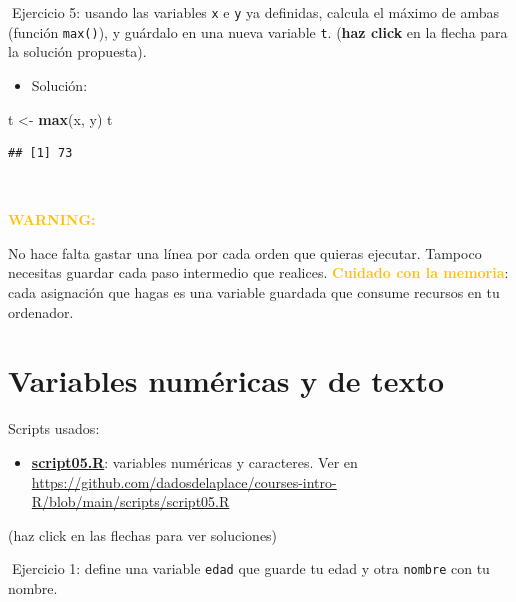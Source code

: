 \documentclass[11pt,]{book}
\newenvironment{Shaded}{\begin{snugshade}}{\end{snugshade}}
\newcommand{\KeywordTok}[1]{\textcolor[rgb]{0.27,0.27,0.27}{\textbf{#1}}}
\newcommand{\NormalTok}[1]{#1}
\newcommand{\StringTok}[1]{\textcolor[rgb]{0.5,0.5,0.5}{#1}}
\providecommand{\tightlist}{%
  \setlength{\itemsep}{0pt}\setlength{\parskip}{0pt}}
\begin{document}
📝Ejercicio 5: usando las variables \texttt{x} e \texttt{y} ya definidas, calcula el máximo de ambas (función \texttt{max()}), y guárdalo en una nueva variable \texttt{t}. (\textbf{haz click} en la flecha para la solución propuesta).

\begin{itemize}
\tightlist
\item
  Solución:
\end{itemize}

\begin{Shaded}
\begin{Highlighting}[]
\NormalTok{t <-}\StringTok{ }\KeywordTok{max}\NormalTok{(x, y)}
\NormalTok{t}
\end{Highlighting}
\end{Shaded}

\begin{verbatim}
## [1] 73
\end{verbatim}

~

\textbf{\textcolor{#ffc107}{WARNING:}}

No hace falta gastar una línea por cada orden que quieras ejecutar. Tampoco necesitas guardar cada paso intermedio que realices. \textbf{\textcolor{#ffc107}{Cuidado con la memoria}}: cada asignación que hagas es una variable guardada que consume recursos en tu ordenador.

\hypertarget{variables-numuxe9ricas-y-de-texto}{%
\section{Variables numéricas y de texto}\label{variables-numuxe9ricas-y-de-texto}}

\begin{blackbox}

Scripts usados:

\begin{itemize}
\tightlist
\item
  \href{https://github.com/dadosdelaplace/courses-intro-R/blob/main/scripts/script05.R}{\textbf{script05.R}}: variables numéricas y caracteres. Ver en \url{https://github.com/dadosdelaplace/courses-intro-R/blob/main/scripts/script05.R}
\end{itemize}


\end{blackbox}

(haz click en las flechas para ver soluciones)

📝Ejercicio 1: define una variable \texttt{edad} que guarde tu edad y otra \texttt{nombre} con tu nombre.
\end{document}
